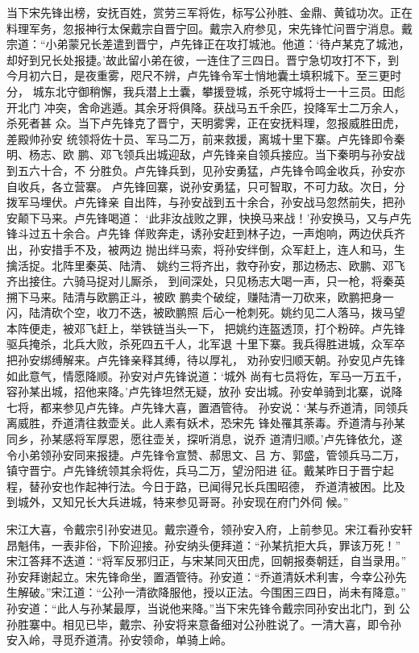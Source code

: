当下宋先锋出榜，安抚百姓，赏劳三军将佐，标写公孙胜、金鼎、黄钺功次。正在
料理军务，忽报神行太保戴宗自晋宁回。戴宗入府参见，宋先锋忙问晋宁消息。戴
宗道：“小弟蒙兄长差遣到晋宁，卢先锋正在攻打城池。他道：‘待卢某克了城池，
却好到兄长处报捷。’故此留小弟在彼，一连住了三四日。晋宁急切攻打不下，到
今月初六日，是夜重雾，咫尺不辨，卢先锋令军士悄地囊土填积城下。至三更时分，
城东北守御稍懈，我兵潜上土囊，攀援登城，杀死守城将士一十三员。田彪开北门
冲突，舍命逃遁。其余牙将俱降。获战马五千余匹，投降军士二万余人，杀死者甚
众。当下卢先锋克了晋宁，天明雾霁，正在安抚料理，忽报威胜田虎，差殿帅孙安
统领将佐十员、军马二万，前来救援，离城十里下寨。卢先锋即令秦明、杨志、欧
鹏、邓飞领兵出城迎敌，卢先锋亲自领兵接应。当下秦明与孙安战到五六十合，不
分胜负。卢先锋兵到，见孙安勇猛，卢先锋令鸣金收兵，孙安亦自收兵，各立营寨。
卢先锋回寨，说孙安勇猛，只可智取，不可力敌。次日，分拨军马埋伏。卢先锋亲
自出阵，与孙安战到五十余合，孙安战马忽然前失，把孙安颠下马来。卢先锋喝道：
‘此非汝战败之罪，快换马来战！’孙安换马，又与卢先锋斗过五十余合。卢先锋
佯败奔走，诱孙安赶到林子边，一声炮响，两边伏兵齐出，孙安措手不及，被两边
抛出绊马索，将孙安绊倒，众军赶上，连人和马，生擒活捉。北阵里秦英、陆清、
姚约三将齐出，救夺孙安，那边杨志、欧鹏、邓飞齐出接住。六骑马捉对儿厮杀，
到间深处，只见杨志大喝一声，只一枪，将秦英搠下马来。陆清与欧鹏正斗，被欧
鹏卖个破绽，赚陆清一刀砍来，欧鹏把身一闪，陆清砍个空，收刀不迭，被欧鹏照
后心一枪刺死。姚约见二人落马，拨马望本阵便走，被邓飞赶上，举铁链当头一下，
把姚约连盔透顶，打个粉碎。卢先锋驱兵掩杀，北兵大败，杀死四五千人，北军退
十里下寨。我兵得胜进城，众军卒把孙安绑缚解来。卢先锋亲释其缚，待以厚礼，
劝孙安归顺天朝。孙安见卢先锋如此意气，情愿降顺。孙安对卢先锋说道：‘城外
尚有七员将佐，军马一万五千，容孙某出城，招他来降。’卢先锋坦然无疑，放孙
安出城。孙安单骑到北寨，说降七将，都来参见卢先锋。卢先锋大喜，置酒管待。
孙安说：‘某与乔道清，同领兵离威胜，乔道清往救壶关。此人素有妖术，恐宋先
锋处罹其荼毒。乔道清与孙某同乡，孙某感将军厚恩，愿往壶关，探听消息，说乔
道清归顺。’卢先锋依允，遂令小弟领孙安同来报捷。卢先锋令宣赞、郝思文、吕
方、郭盛，管领兵马二万，镇守晋宁。卢先锋统领其余将佐，兵马二万，望汾阳进
征。戴某昨日于晋宁起程，替孙安也作起神行法。今日于路，已闻得兄长兵围昭德，
乔道清被困。比及到城外，又知兄长大兵进城，特来参见哥哥。孙安现在府门外伺
候。”

宋江大喜，令戴宗引孙安进见。戴宗遵令，领孙安入府，上前参见。宋江看孙安轩
昂魁伟，一表非俗，下阶迎接。孙安纳头便拜道：“孙某抗拒大兵，罪该万死！”
宋江答拜不迭道：“将军反邪归正，与宋某同灭田虎，回朝报奏朝廷，自当录用。”
孙安拜谢起立。宋先锋命坐，置酒管待。孙安道：“乔道清妖术利害，今幸公孙先
生解破。”宋江道：“公孙一清欲降服他，授以正法。今围困三四日，尚未有降意。”
孙安道：“此人与孙某最厚，当说他来降。”当下宋先锋令戴宗同孙安出北门，到
公孙胜寨中。相见已毕，戴宗、孙安将来意备细对公孙胜说了。一清大喜，即令孙
安入岭，寻觅乔道清。孙安领命，单骑上岭。

